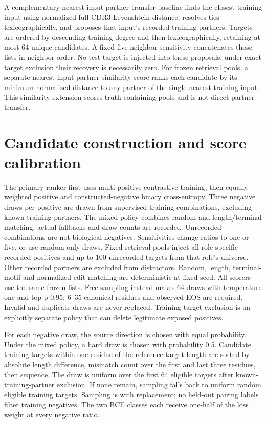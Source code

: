 \documentclass[a4paper,11pt]{article}
\begin{document}
A complementary nearest-input partner-transfer baseline finds the closest
training input using normalized full-CDR3 Levenshtein distance, resolves ties
lexicographically, and proposes that input's recorded training partners. Targets
are ordered by descending training degree and then lexicographically, retaining
at most 64 unique candidates. A fixed five-neighbor sensitivity concatenates
those lists in neighbor order. No test target is injected into these proposals;
under exact target exclusion their recovery is necessarily zero. For frozen
retrieval pools, a separate nearest-input partner-similarity score ranks each
candidate by its minimum normalized distance to any partner of the single
nearest training input. This similarity extension scores truth-containing
pools and is not direct partner transfer.


\section{Candidate construction and score calibration}
The primary ranker first uses multi-positive contrastive training, then equally
weighted positive and constructed-negative binary cross-entropy. Three negative
draws per positive are drawn from supervised-training combinations, excluding
known training partners. The mixed policy combines random and length/terminal
matching; actual fallbacks and draw counts are recorded. Unrecorded combinations
are not biological negatives. Sensitivities change ratios to one or five, or
use random-only draws. Fixed retrieval pools inject all role-specific recorded
positives and up to 100 unrecorded targets from that role's universe. Other
recorded partners are excluded from distractors. Random, length, terminal-motif
and normalized-edit matching are deterministic at fixed seed. All scorers use
the same frozen lists. Free sampling instead makes 64 draws with temperature
one and top-p 0.95; 6--35 canonical residues and observed EOS are required.
Invalid and duplicate draws are never replaced. Training-target exclusion is
an explicitly separate policy that can delete legitimate exposed positives.

For each negative draw, the source direction is chosen with equal probability.
Under the mixed policy, a hard draw is chosen with probability 0.5. Candidate
training targets within one residue of the reference target length are sorted
by absolute length difference, mismatch count over the first and last three
residues, then sequence. The draw is uniform over the first 64 eligible targets
after known-training-partner exclusion. If none remain, sampling falls back to
uniform random eligible training targets. Sampling is with replacement;
no held-out pairing labels filter training negatives. The two BCE classes each
receive one-half of the loss weight at every negative ratio.
\end{document}
